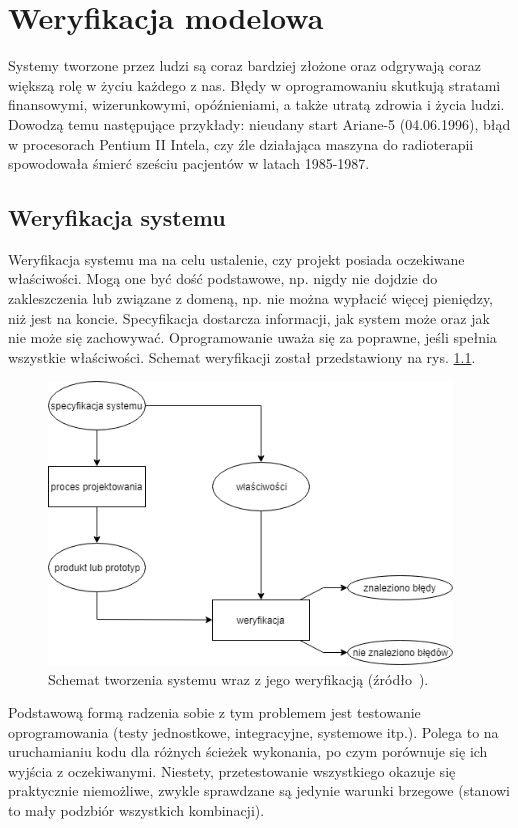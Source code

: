 \chapter{Weryfikacja modelowa}

Systemy tworzone przez ludzi są coraz bardziej złożone oraz odgrywają coraz większą rolę w życiu każdego z nas.
Błędy w oprogramowaniu skutkują stratami finansowymi, wizerunkowymi, opóźnieniami, a także utratą zdrowia i życia ludzi. Dowodzą temu następujące przykłady: nieudany start Ariane-5 (04.06.1996), błąd w procesorach Pentium II Intela, czy źle działająca maszyna do radioterapii spowodowała śmierć sześciu pacjentów w latach 1985-1987.


\section{Weryfikacja systemu}

Weryfikacja systemu ma na celu ustalenie, czy projekt posiada oczekiwane właściwości. Mogą one być dość podstawowe, np. nigdy nie dojdzie do zakleszczenia lub związane z domeną, np. nie można wypłacić więcej pieniędzy, niż jest na koncie. Specyfikacja dostarcza informacji, jak system może oraz jak nie może się zachowywać. Oprogramowanie uważa się za poprawne, jeśli spełnia wszystkie właściwości. Schemat weryfikacji został przedstawiony na rys. \ref{fig:system_verification_scheme}.

\begin{figure}[h]
    \centering
    \includegraphics[height=7.5cm,keepaspectratio]{img/system_verification_schematic_view.png}
    \caption{Schemat tworzenia systemu wraz z jego weryfikacją (źródło~\cite{Bai08}).}
    \label{fig:system_verification_scheme}
\end{figure}

Podstawową formą radzenia sobie z tym problemem jest testowanie oprogramowania (testy jednostkowe, integracyjne, systemowe itp.). Polega to na uruchamianiu kodu dla różnych ścieżek wykonania, po czym porównuje się ich wyjścia z oczekiwanymi. Niestety, przetestowanie wszystkiego okazuje się praktycznie niemożliwe, zwykle sprawdzane są jedynie warunki brzegowe (stanowi to mały podzbiór wszystkich kombinacji). 



